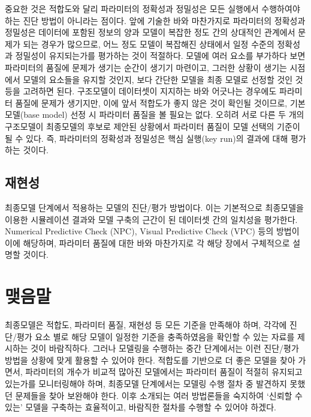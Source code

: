 \documentclass[
  10pt,
  krantz2,
  a4paper]{krantz}
\theoremstyle{definition}
\theoremstyle{definition}
\theoremstyle{definition}
\theoremstyle{remark}
\begin{document}
중요한 것은 적합도와 달리 파라미터의 정확성과 정밀성은 모든 실행에서 수행하여야 하는 진단 방법이 아니라는 점이다. 앞에 기술한 바와 마찬가지로 파라미터의 정확성과 정밀성은 데이터에 포함된 정보의 양과 모델이 복잡한 정도 간의 상대적인 관계에서 문제가 되는 경우가 많으므로, 어느 정도 모델이 복잡해진 상태에서 일정 수준의 정확성과 정밀성이 유지되는가를 평가하는 것이 적절하다. 모델에 여러 요소를 부가하다 보면 파라미터의 품질에 문제가 생기는 순간이 생기기 마련이고, 그러한 상황이 생기는 시점에서 모델의 요소들을 유지할 것인지, 보다 간단한 모델을 최종 모델로 선정할 것인 것 등을 고려하면 된다. 구조모델이 데이터셋이 지지하는 바와 어긋나는 경우에도 파라미터 품질에 문제가 생기지만, 이에 앞서 적합도가 좋지 않은 것이 확인될 것이므로, 기본모델(base model) 선정 시 파라미터 품질을 볼 필요는 없다. 오히려 서로 다른 두 개의 구조모델이 최종모델의 후보로 제안된 상황에서 파라미터 품질이 모델 선택의 기준이 될 수 있다. 즉, 파라미터의 정확성과 정밀성은 핵심 실행(key run)의 결과에 대해 평가하는 것이다.

\hypertarget{uxc7acuxd604uxc131}{%
\subsection{재현성}\label{uxc7acuxd604uxc131}}

최종모델 단계에서 적용하는 모델의 진단/평가 방법이다. 이는 기본적으로 최종모델을 이용한 시뮬레이션 결과와 모델 구축의 근간이 된 데이터셋 간의 일치성을 평가한다. Numerical Predictive Check (NPC), Visual Predictive Check (VPC) 등의 방법이 이에 해당하며, 파라미터 품질에 대한 바와 마찬가지로 각 해당 장에서 구체적으로 설명할 것이다.

\hypertarget{uxb9fauxc74cuxb9d0}{%
\section{맺음말}\label{uxb9fauxc74cuxb9d0}}

최종모델은 적합도, 파라미터 품질, 재현성 등 모든 기준을 만족해야 하며, 각각에 진단/평가 요소 별로 해당 모델이 일정한 기준을 충족하였음을 확인할 수 있는 자료를 제시하는 것이 바람직하다. 그러나 모델링을 수행하는 중간 단계에서는 이런 진단/평가 방법을 상황에 맞게 활용할 수 있어야 한다. 적합도를 기반으로 더 좋은 모델을 찾아 가면서, 파라미터의 개수가 비교적 많아진 모델에서는 파라미터 품질이 적절히 유지되고 있는가를 모니터링해야 하며, 최종모델 단계에서는 모델링 수행 절차 중 발견하지 못했던 문제들을 찾아 보완해야 한다. 이후 소개되는 여러 방법론들을 숙지하여 `신뢰할 수 있는' 모델을 구축하는 효율적이고, 바람직한 절차를 수행할 수 있어야 하겠다.
\end{document}
